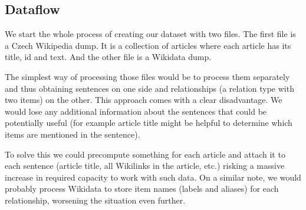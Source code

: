 \subsection{Dataflow}

We start the whole process of creating our dataset with two files. The first file is a Czech Wikipedia dump. It is a collection of articles where each article has its title, id and text. And the other file is a Wikidata dump. 

The simplest way of processing those files would be to process them separately and thus obtaining sentences on one side and relationships (a relation type with two items) on the other. This approach comes with a clear disadvantage. We would lose any additional information about the sentences that could be potentially useful (for example article title might be helpful to determine which items are mentioned in the sentence). 

To solve this we could precompute something for each article and attach it to each sentence (article title, all Wikilinks in the article, etc.) risking a massive increase in required capacity to work with such data. On a similar note, we would probably process Wikidata to store item names (labels and aliases) for each relationship, worsening the situation even further.

\begin{figure}
\centering
{}
\qquad
{}
\label{obr:informedvsuninformed}
\end{figure}



